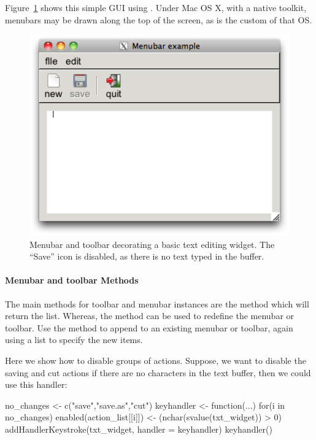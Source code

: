 Figure~\ref{fig:fig-gWidgets-menubar-disabled} shows this simple GUI
using .  Under Mac OS X, with a native toolkit,
menubars may be drawn along the top of the screen, as is the custom of
that OS.

\begin{figure}
  \centering
  \includegraphics[width=.5\textwidth]{fig-gWidgets-menubar-disabled.png}
  \caption{Menubar and toolbar decorating a basic text editing
    widget. The ``Save'' icon is disabled, as there is no text typed
    in the buffer.}
  \label{fig:fig-gWidgets-menubar-disabled}
\end{figure}

\paragraph{Menubar and toolbar Methods}
The main methods for toolbar and menubar instances are
the  method which will return the list. Whereas, the
 method can be used to redefine the
menubar or toolbar. Use the  method to append to an
existing menubar or toolbar, again using a list to specify the new items.


Here we show how to disable groups of actions. Suppose, we want to
disable the saving and cut actions if there are no characters in the
text buffer, then we could use this handler:

\begin{Schunk}
\begin{Sinput}
 no_changes <- c("save","save.as","cut")
 keyhandler <- function(...) {
   for(i in no_changes)
     enabled(action_list[[i]]) <- 
       (nchar(svalue(txt_widget)) > 0)
 }
 addHandlerKeystroke(txt_widget, handler = keyhandler)
 keyhandler()
\end{Sinput}
\end{Schunk}


